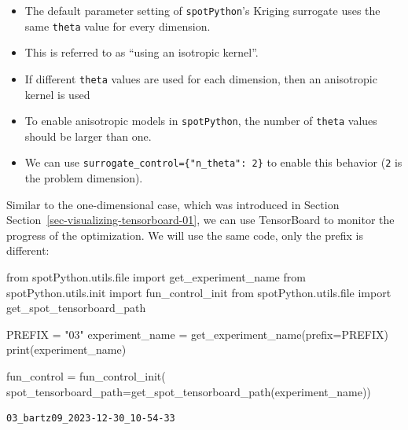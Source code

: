 \documentclass[
  letterpaper,
  DIV=11,
  numbers=noendperiod]{scrreprt}
\newenvironment{Shaded}{\begin{snugshade}}{\end{snugshade}}
\newcommand{\BuiltInTok}[1]{\textcolor[rgb]{0.00,0.23,0.31}{#1}}
\newcommand{\ImportTok}[1]{\textcolor[rgb]{0.00,0.46,0.62}{#1}}
\newcommand{\NormalTok}[1]{\textcolor[rgb]{0.00,0.23,0.31}{#1}}
\newcommand{\OperatorTok}[1]{\textcolor[rgb]{0.37,0.37,0.37}{#1}}
\newcommand{\StringTok}[1]{\textcolor[rgb]{0.13,0.47,0.30}{#1}}
\providecommand{\tightlist}{%
  \setlength{\itemsep}{0pt}\setlength{\parskip}{0pt}}\usepackage{longtable,booktabs,array}
\begin{document}
\begin{itemize}
\tightlist
\item
  The default parameter setting of \texttt{spotPython}'s Kriging
  surrogate uses the same \texttt{theta} value for every dimension.
\item
  This is referred to as ``using an isotropic kernel''.
\item
  If different \texttt{theta} values are used for each dimension, then
  an anisotropic kernel is used
\item
  To enable anisotropic models in \texttt{spotPython}, the number of
  \texttt{theta} values should be larger than one.
\item
  We can use \texttt{surrogate\_control=\{"n\_theta":\ 2\}} to enable
  this behavior (\texttt{2} is the problem dimension).
\end{itemize}

\begin{tcolorbox}[enhanced jigsaw, arc=.35mm, colback=white, bottomtitle=1mm, toprule=.15mm, coltitle=black, titlerule=0mm, leftrule=.75mm, title=\textcolor{quarto-callout-note-color}{\faInfo}\hspace{0.5em}{TensorBoard}, opacitybacktitle=0.6, breakable, colbacktitle=quarto-callout-note-color!10!white, opacityback=0, toptitle=1mm, rightrule=.15mm, left=2mm, colframe=quarto-callout-note-color-frame, bottomrule=.15mm]

Similar to the one-dimensional case, which was introduced in Section
Section~\ref{sec-visualizing-tensorboard-01}, we can use TensorBoard to
monitor the progress of the optimization. We will use the same code,
only the prefix is different:

\begin{Shaded}
\begin{Highlighting}[]
\ImportTok{from}\NormalTok{ spotPython.utils.}\BuiltInTok{file} \ImportTok{import}\NormalTok{ get\_experiment\_name}
\ImportTok{from}\NormalTok{ spotPython.utils.init }\ImportTok{import}\NormalTok{ fun\_control\_init}
\ImportTok{from}\NormalTok{ spotPython.utils.}\BuiltInTok{file} \ImportTok{import}\NormalTok{ get\_spot\_tensorboard\_path}

\NormalTok{PREFIX }\OperatorTok{=} \StringTok{"03"}
\NormalTok{experiment\_name }\OperatorTok{=}\NormalTok{ get\_experiment\_name(prefix}\OperatorTok{=}\NormalTok{PREFIX)}
\BuiltInTok{print}\NormalTok{(experiment\_name)}

\NormalTok{fun\_control }\OperatorTok{=}\NormalTok{ fun\_control\_init(}
\NormalTok{    spot\_tensorboard\_path}\OperatorTok{=}\NormalTok{get\_spot\_tensorboard\_path(experiment\_name))}
\end{Highlighting}
\end{Shaded}

\begin{verbatim}
03_bartz09_2023-12-30_10-54-33
\end{verbatim}

\end{tcolorbox}
\end{document}
